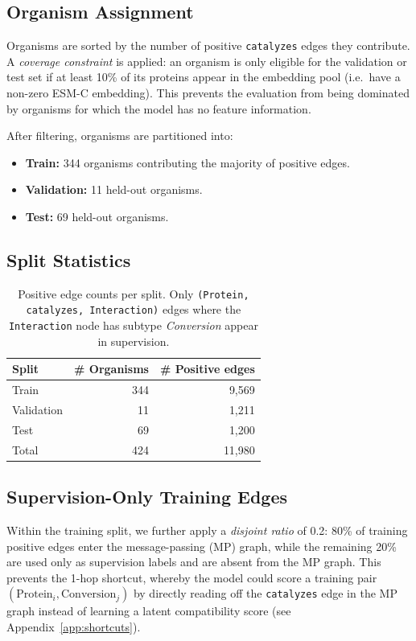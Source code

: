 \subsection{Organism Assignment}

Organisms are sorted by the number of positive \texttt{catalyzes} edges they
contribute.
A \emph{coverage constraint} is applied: an organism is only eligible for the
validation or test set if at least 10\% of its proteins appear in the embedding
pool (i.e.\ have a non-zero ESM-C embedding).
This prevents the evaluation from being dominated by organisms for which the
model has no feature information.

After filtering, organisms are partitioned into:
\begin{itemize}
  \item \textbf{Train:} 344 organisms contributing the majority of positive edges.
  \item \textbf{Validation:} 11 held-out organisms.
  \item \textbf{Test:} 69 held-out organisms.
\end{itemize}

\subsection{Split Statistics}

\begin{table}[h]
\centering
\caption{Positive edge counts per split.
Only \texttt{(Protein, catalyzes, Interaction)} edges where the
\texttt{Interaction} node has subtype \emph{Conversion} appear in supervision.}
\label{tab:splits}
\begin{tabular}{lrr}
\toprule
Split & \# Organisms & \# Positive edges \\
\midrule
Train      & 344 & 9,569 \\
Validation & 11  & 1,211 \\
Test       & 69  & 1,200 \\
\midrule
Total      & 424 & 11,980 \\
\bottomrule
\end{tabular}
\end{table}

\subsection{Supervision-Only Training Edges}

Within the training split, we further apply a \emph{disjoint ratio} of 0.2:
80\% of training positive edges enter the message-passing (MP) graph, while the
remaining 20\% are used only as supervision labels and are absent from the MP
graph.
This prevents the 1-hop shortcut, whereby the model could score a training pair
$(\text{Protein}_i, \text{Conversion}_j)$ by directly reading off the
\texttt{catalyzes} edge in the MP graph instead of learning a latent
compatibility score (see Appendix~\ref{app:shortcuts}).


